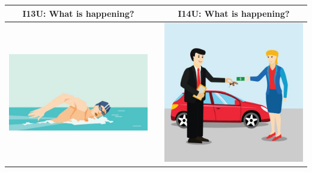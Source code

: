 \documentclass[12pt,notitlepage]{article}
\begin{document}
\begin{center}
\begin{tabular}{|c|c|c|}
\hline
I13U: What is happening? && I14U: What is happening? \\
\hline
\includegraphics[width=20em,trim=0 0 0 -3]{figures/I13.jpg} & & \includegraphics[width=20em,trim=0 0 0 -3]{figures/I14.jpg} \\
\hline
\end{tabular}
\vspace{1em} \\



\end{center}
\end{document}
